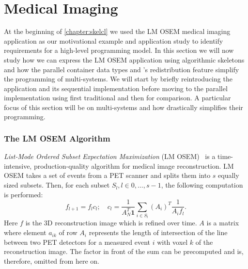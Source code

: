 \section{Medical Imaging}
\label{section:medical-imaging}
At the beginning of \autoref{chapter:skelcl} we used the LM OSEM medical imaging application as our motivational example and application study to identify requirements for a high-level programming model.
In this section we will now study how we can express the LM OSEM application using algorithmic skeletons and how the parallel container data types and \SkelCL's redistribution feature simplify the programming of multi-\GPU systems.
We will start by briefly reintroducing the application and its sequential implementation before moving to the parallel implementation using first traditional \OpenCL and then \SkelCL for comparison.
A particular focus of this section will be on multi-\GPU systems and how \SkelCL drastically simplifies their programming.

\subsubsection*{The LM OSEM Algorithm}
\emph{List-Mode Ordered Subset Expectation Maximization} (LM OSEM)~\cite{ReaderErFlOt1998, SchellmannGoMeKoScWuBu2009} is a time-intensive, production-quality algorithm for medical image reconstruction.
LM OSEM takes a set of events from a PET scanner and splits them into $s$ equally sized subsets.
Then, for each subset $S_l, l \in {0, \ldots, s-1}$, the following computation is performed:
\begin{equation}
 f_{l+1}=f_{l}c_{l};\quad
 c_{l}=\dfrac{1}{A_N^T \textbf{1}}
\sum_{i \in S_{l}} (A_i)^T \dfrac{1}{A_{i} f_{l}}.
\label{eq:lm_osem2}
\end{equation}
Here $f$ is the 3D reconstruction image which is refined over time.
$A$ is a matrix where element $a_{ik}$ of row $A_i$ represents the length of intersection of the line between two PET detectors for a measured event $i$ with voxel $k$ of the reconstruction image.
The factor in front of the sum can be precomputed and is, therefore, omitted from here on.

